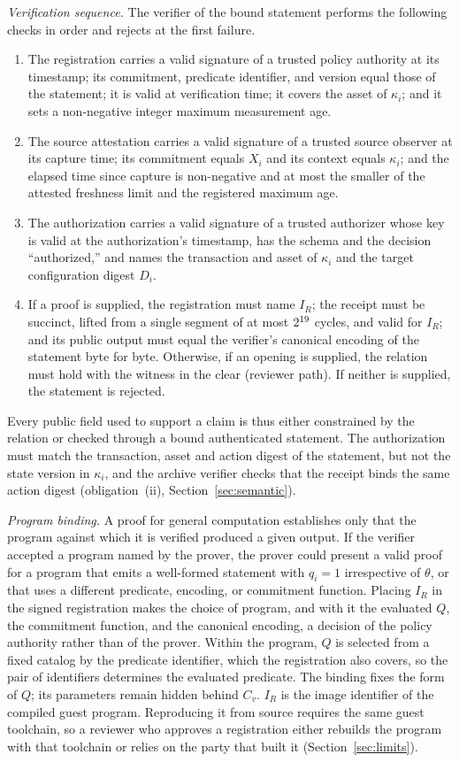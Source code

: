 \emph{Verification sequence.} The verifier of the bound statement performs the following checks in order and rejects at the first failure.
\begin{enumerate}
\item The registration carries a valid signature of a trusted policy authority at its timestamp; its commitment, predicate identifier, and version equal those of the statement; it is valid at verification time; it covers the asset of $\kappa_i$; and it sets a non-negative integer maximum measurement age.
\item The source attestation carries a valid signature of a trusted source observer at its capture time; its commitment equals $X_i$ and its context equals $\kappa_i$; and the elapsed time since capture is non-negative and at most the smaller of the attested freshness limit and the registered maximum age.
\item The authorization carries a valid signature of a trusted authorizer whose key is valid at the authorization's timestamp, has the schema  and the decision ``authorized,'' and names the transaction and asset of $\kappa_i$ and the target configuration digest $D_i$.
\item If a proof is supplied, the registration must name $I_R$; the receipt must be succinct, lifted from a single segment of at most $2^{19}$ cycles, and valid for $I_R$; and its public output must equal the verifier's canonical encoding of the statement byte for byte. Otherwise, if an opening is supplied, the relation must hold with the witness in the clear (reviewer path). If neither is supplied, the statement is rejected.
\end{enumerate}
Every public field used to support a claim is thus either constrained by the relation or checked through a bound authenticated statement. The authorization must match the transaction, asset and action digest of the statement, but not the state version in $\kappa_i$, and the archive verifier checks that the receipt binds the same action digest (obligation~(ii), Section~\ref{sec:semantic}).

\emph{Program binding.} A proof for general computation establishes only that the program against which it is verified produced a given output. If the verifier accepted a program named by the prover, the prover could present a valid proof for a program that emits a well-formed statement with $q_i=1$ irrespective of $\theta$, or that uses a different predicate, encoding, or commitment function. Placing $I_R$ in the signed registration makes the choice of program, and with it the evaluated $Q$, the commitment function, and the canonical encoding, a decision of the policy authority rather than of the prover. Within the program, $Q$ is selected from a fixed catalog by the predicate identifier, which the registration also covers, so the pair of identifiers determines the evaluated predicate. The binding fixes the form of $Q$; its parameters remain hidden behind $C_v$. $I_R$ is the image identifier of the compiled guest program. Reproducing it from source requires the same guest toolchain, so a reviewer who approves a registration either rebuilds the program with that toolchain or relies on the party that built it (Section~\ref{sec:limits}).

